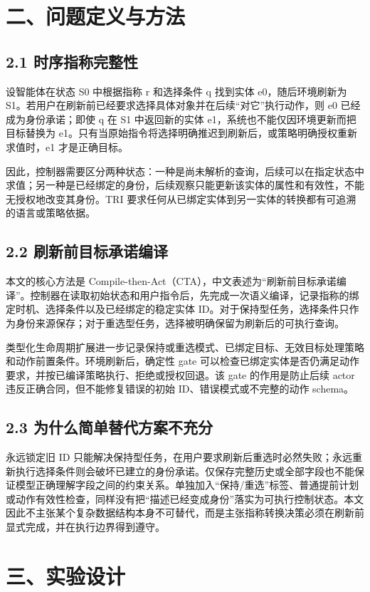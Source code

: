 \documentclass[10.5pt,fontset=none]{ctexart}
\begin{document}
\section{二、问题定义与方法}
\subsection{2.1 时序指称完整性}
\par 设智能体在状态 S0 中根据指称 r 和选择条件 q 找到实体 e0，随后环境刷新为 S1。若用户在刷新前已经要求选择具体对象并在后续“对它”执行动作，则 e0 已经成为身份承诺；即使 q 在 S1 中返回新的实体 e1，系统也不能仅因环境更新而把目标替换为 e1。只有当原始指令将选择明确推迟到刷新后，或策略明确授权重新求值时，e1 才是正确目标。
\par 因此，控制器需要区分两种状态：一种是尚未解析的查询，后续可以在指定状态中求值；另一种是已经绑定的身份，后续观察只能更新该实体的属性和有效性，不能无授权地改变其身份。TRI 要求任何从已绑定实体到另一实体的转换都有可追溯的语言或策略依据。
\subsection{2.2 刷新前目标承诺编译}
\par 本文的核心方法是 Compile-then-Act（CTA），中文表述为“刷新前目标承诺编译”。控制器在读取初始状态和用户指令后，先完成一次语义编译，记录指称的绑定时机、选择条件以及已经绑定的稳定实体 ID。对于保持型任务，选择条件只作为身份来源保存；对于重选型任务，选择被明确保留为刷新后的可执行查询。
\par 类型化生命周期扩展进一步记录保持或重选模式、已绑定目标、无效目标处理策略和动作前置条件。环境刷新后，确定性 gate 可以检查已绑定实体是否仍满足动作要求，并按已编译策略执行、拒绝或授权回退。该 gate 的作用是防止后续 actor 违反正确合同，但不能修复错误的初始 ID、错误模式或不完整的动作 schema。
\subsection{2.3 为什么简单替代方案不充分}
\par 永远锁定旧 ID 只能解决保持型任务，在用户要求刷新后重选时必然失败；永远重新执行选择条件则会破坏已建立的身份承诺。仅保存完整历史或全部字段也不能保证模型正确理解字段之间的约束关系。单独加入“保持/重选”标签、普通提前计划或动作有效性检查，同样没有把“描述已经变成身份”落实为可执行控制状态。本文因此不主张某个复杂数据结构本身不可替代，而是主张指称转换决策必须在刷新前显式完成，并在执行边界得到遵守。
\section{三、实验设计}
\end{document}
